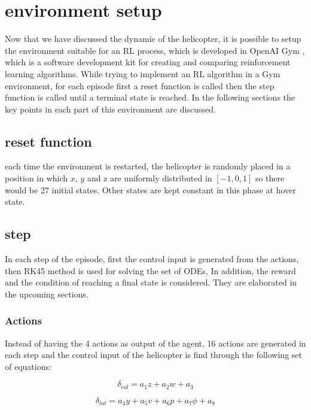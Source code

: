 \section{environment setup}

Now that we have discussed the dynamic of the helicopter, it is possible to setup the environment suitable for an RL process, which is developed in OpenAI Gym \cite{brockman2016openai}, which is a software development kit for creating and comparing reinforcement learning algorithms. While trying to implement an RL algorithm in a Gym environment, for each episode first a reset function is called then the step function is called until a terminal state is reached. In the following sections the key points in each part of this environment are discussed. \\

\subsection{reset function} \label{reset}

each time the environment is restarted, the helicopter is randomly placed in a position in which $x$, $y$ and z are uniformly distributed in $[-1,0,1]$ so there would be 27 initial states. Other states are kept constant in this phase at hover state.%

\subsection{step}
In each step of the episode, first the control input is generated from the actions, then RK45 method is used for solving the set of ODEs, In addition, the reward and the condition of reaching a final state is considered. They are elaborated in the upcoming sections.

\subsubsection{Actions}
Instead of having the 4 actions as output of the agent, 16 actions are generated in each step and the control input of the helicopter is find through the following set of equations:

\begin{equation}
	\delta_{col} = a_1 z + a_2 w + a_3
\end{equation} 

\begin{equation}
	\delta_{lat} = a_4 y + a_5 v + a_6 p + a_7 \phi + a_8
\end{equation}

